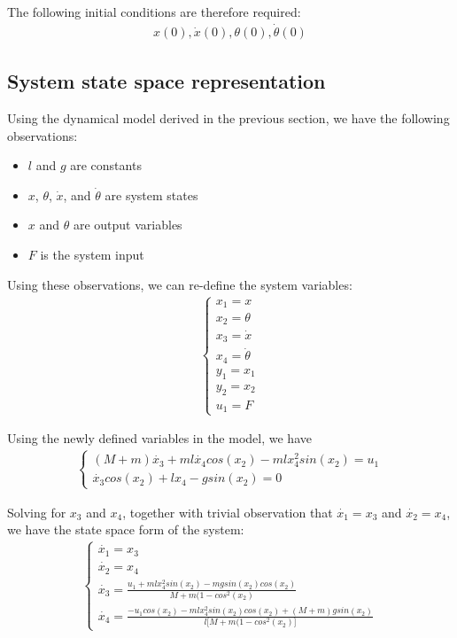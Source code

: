 \documentclass [12pt,letterpaper]{exam}
\begin{document}
The following initial conditions are therefore required:
\begin{align}
x(0), \dot{x}(0), \theta(0), \dot{\theta}(0)
\end{align}

\subsection{System state space representation}
Using the dynamical model derived in the previous section, we have the following observations:

\begin{itemize}
    \item $l$ and $g$ are constants
    \item $x$, $\theta$, $\dot{x}$, and $\dot{\theta}$ are system states
    \item $x$ and $\theta$ are output variables
    \item $F$ is the system input
\end{itemize}

Using these observations, we can re-define the system variables:
\begin{align}
\begin{cases}
x_1 = x \\
x_2 = \theta \\
x_3 = \dot{x} \\
x_4 = \dot{\theta} \\
y_1 = x_1 \\
y_2 = x_2 \\
u_1 = F
\end{cases}
\end{align}

Using the newly defined variables in the model, we have
\begin{align}
\begin{cases}
(M + m)\dot{x_3} + ml\dot{x_4}cos(x_2) - mlx_4^2sin(x_2) = u_1 \\
\dot{x_3}cos(x_2) + lx_4 - gsin(x_2) = 0
\end{cases}
\end{align}

Solving for $x_3$ and $x_4$, together with trivial observation that $\dot{x_1} = x_3$ and $\dot{x_2} = x_4$, we have the state space form of the system:
\begin{align}
\begin{cases}
\dot{x_1} = x_3 \\
\dot{x_2} = x_4 \\
\dot{x_3} = \frac{u_1 + mlx_4^2sin(x_2) - mgsin(x_2)cos(x_2)}{M + m(1 - cos^{2}(x_2)} \\
\dot{x_4} = \frac{-u_1cos(x_2) - mlx_4^2sin(x_2)cos(x_2) + (M + m)gsin(x_2)}{l\big[M + m(1 - cos^{2}(x_2)\big]}
\end{cases}
\end{align}
\end{document}
